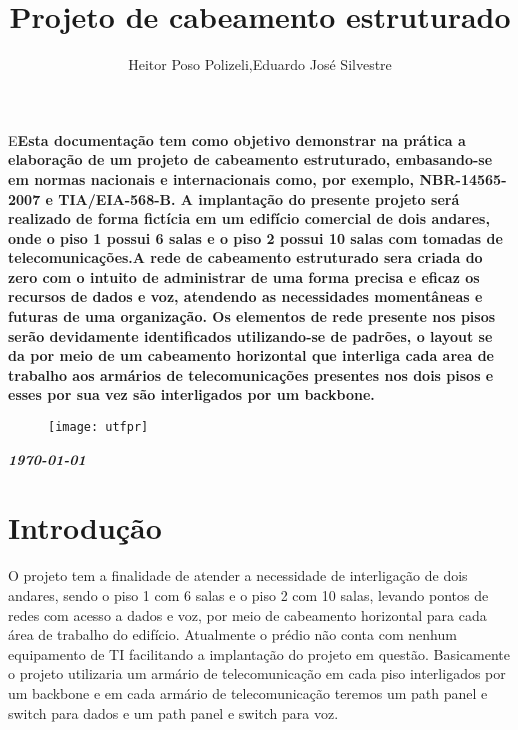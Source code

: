\documentclass[	DIV=calc,%
							paper=a4,%
							fontsize=12pt,%
							onecolumn]{scrartcl}	 					%
\title{Projeto de cabeamento estruturado}					%
\author{Heitor Poso Polizeli,Eduardo José Silvestre}  	%
\date{}																				%
\newcommand{\initial}[1]{%
     \lettrine[lines=3,lhang=0.3,nindent=0em]{
     				\color{DarkGoldenrod}
     				{\textsf{#1}}}{}}
\begin{document}
\maketitle
\thispagestyle{fancy} 	
\thispagestyle{empty}		%




\initial{E}\textbf{Esta documentação tem como objetivo demonstrar na prática a elaboração de um projeto
	de cabeamento estruturado, embasando-se em normas nacionais e internacionais como,
	por exemplo, NBR-14565-2007 e TIA/EIA-568-B. A implantação do presente projeto será realizado de forma fictícia em um edifício comercial de dois andares, onde o piso 1 possui 6 salas e o piso 2 possui 10 salas com tomadas de telecomunicações.A rede de cabeamento estruturado sera criada do zero com o intuito de administrar de uma forma precisa e eficaz os recursos de dados e voz, atendendo as necessidades momentâneas e futuras de uma organização. Os elementos de rede presente nos pisos serão devidamente identificados utilizando-se de padrões, o layout se da por meio de um cabeamento horizontal que interliga cada area de trabalho aos armários de telecomunicações presentes nos dois pisos e esses por sua vez são interligados por um backbone.     }

\begin{figure}
	\centering
	\texttt{[image: utfpr]}
\end{figure}

\vspace{3cm}
\centerline{\textit{\textbf{\today}}}

\clearpage
    \renewcommand*\listfigurename{Lista de figuras}
\listoffigures

\renewcommand*\listtablename{Lista de tabelas}
\listoftables




\clearpage
\renewcommand{\contentsname}{Sumário}
\tableofcontents
\clearpage

\section{Introdução}
  O projeto tem a finalidade de atender a necessidade de interligação de dois andares, sendo
  o piso 1 com 6 salas e o piso 2 com 10 salas, levando pontos de redes com acesso a dados e
  voz, por meio de cabeamento horizontal para cada área de trabalho do edifício. Atualmente
  o prédio  não conta com nenhum equipamento de TI facilitando a implantação do projeto
  em questão. Basicamente o projeto utilizaria um armário de telecomunicação em cada piso interligados por um backbone e em cada armário de telecomunicação teremos um path panel e switch para dados e um path panel e switch para voz. 
  
\end{document}
